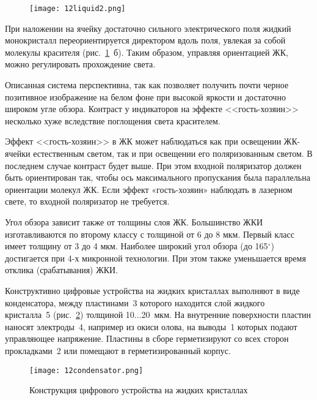 \begin{figure}[h!]
	\texttt{[image: 12liquid2.png]}
	\label{pic:12liquid2}
\end{figure}

При наложении на ячейку достаточно сильного электрического поля жидкий монокристалл переориентируется директором вдоль поля, увлекая за собой молекулы красителя (рис.~\ref{pic:12liquid2}~б). Таким образом, управляя ориентацией ЖК, можно регулировать прохождение света. 

Описанная система перспективна, так как позволяет получить почти черное позитивное изображение на белом фоне при высокой яркости и достаточно широком угле обзора. Контраст у индикаторов на эффекте <<гость-хозяин>> несколько хуже вследствие поглощения света красителем.

Эффект <<гость-хозяин>> в ЖК может наблюдаться как при освещении ЖК-ячейки естественным светом, так и при освещении его поляризованным светом. В последнем случае контраст будет выше. При этом входной поляризатор должен быть ориентирован так, чтобы ось максимального пропускания была параллельна ориентации молекул ЖК. Если эффект «гость-хозяин» наблюдать в лазерном свете, то входной поляризатор не требуется.

Угол обзора зависит также от толщины слоя ЖК. Большинство ЖКИ изготавливаются по второму классу с толщиной от 6 до 8 мкм. Первый класс имеет толщину от 3 до 4 мкм. Наиболее широкий угол обзора (до 165$ ^\circ $) достигается при 4-х микронной технологии. При этом также уменьшается время отклика (срабатывания) ЖКИ.

Конструктивно цифровые устройства на жидких кристаллах выполняют в виде конденсатора, между пластинами~3 которого находится слой жидкого кристалла~5 (рис.~\ref{pic:12condensator}) толщиной 10$ \ldots $20~мкм. На внутренние поверхности пластин наносят электроды~4, например из окиси олова, на выводы~1 которых подают управляющее напряжение. Пластины в сборе герметизируют со всех сторон прокладками~2 или помещают в герметизированный корпус. 

\begin{figure}[h!]
	\caption{ Конструкция цифрового устройства на жидких кристаллах }
	\texttt{[image: 12condensator.png]}
	\label{pic:12condensator}
\end{figure}

